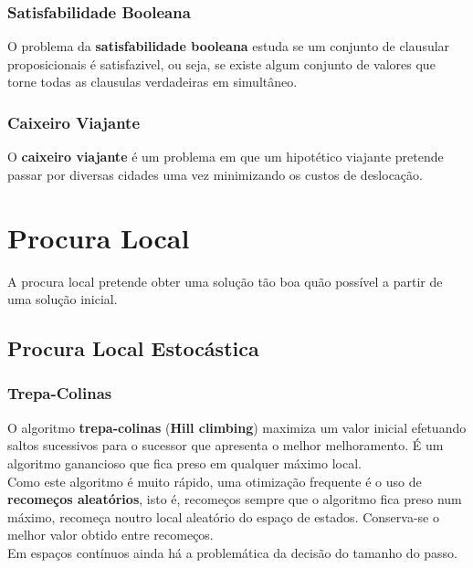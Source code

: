 \documentclass[]{report}
\begin{document}
\subsection{Satisfabilidade Booleana}
O problema da \textbf{satisfabilidade booleana} estuda se um conjunto de clausular proposicionais é satisfazivel, ou seja, se existe algum conjunto de valores que torne todas as clausulas verdadeiras em simultâneo.
\subsection{Caixeiro Viajante}
O \textbf{caixeiro viajante} é um problema em que um hipotético viajante pretende passar por diversas cidades uma vez minimizando os custos de deslocação.
\chapter{Procura Local}
A procura local pretende obter uma solução tão boa quão possível a partir de uma solução inicial.
\section{Procura Local Estocástica}
\subsection{Trepa-Colinas}
O algoritmo \textbf{trepa-colinas} (\textbf{Hill climbing}) maximiza um valor inicial efetuando saltos sucessivos para o sucessor que apresenta o melhor melhoramento.
É um algoritmo ganancioso que fica preso em qualquer máximo local.\\[2mm]
Como este algoritmo é muito rápido, uma otimização frequente é o uso de \textbf{recomeços aleatórios}, isto é, recomeços sempre que o algoritmo fica preso num máximo, recomeça noutro local aleatório do espaço de estados. Conserva-se o melhor valor obtido entre recomeços.\\
Em espaços contínuos ainda há a problemática da decisão do tamanho do passo.
\end{document}
